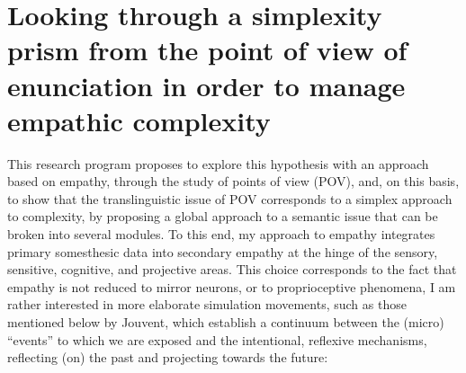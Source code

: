 \documentclass[output=paper]{langscibook}
\begin{document}
\section{Looking through a simplexity prism from the point of view of enunciation in order to manage empathic complexity}


This research program proposes to explore this hypothesis with an approach based on empathy, through the study of points of view (POV), and, on this basis, to show that the translinguistic issue of POV corresponds to a simplex approach to complexity, by proposing a global approach to a semantic issue that can be broken into several modules. To this end, my approach to empathy integrates primary somesthesic data into secondary empathy at the hinge of the sensory, sensitive, cognitive, and projective areas. This choice corresponds to the fact that empathy is not reduced to mirror neurons, or to proprioceptive phenomena, I am rather interested in more elaborate simulation movements, such as those mentioned below by Jouvent, which establish a continuum between the (micro) “events” to which we are exposed and the intentional, reflexive mechanisms, reflecting (on) the past and projecting towards the future:
\end{document}
